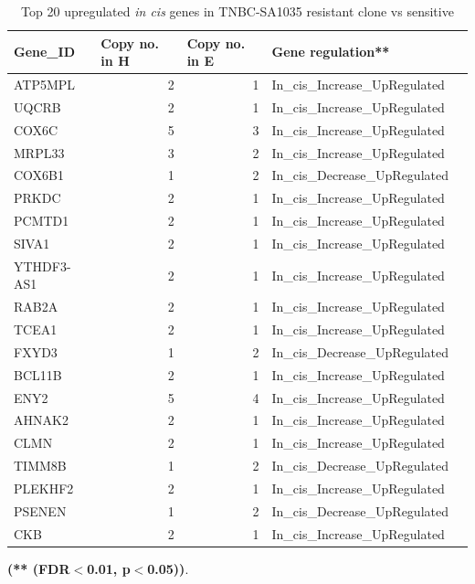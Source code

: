  \begin{table}[htbp]
   \centering
   \caption{Top 20 upregulated \textit{in cis} genes in TNBC-SA1035 resistant clone vs sensitive}
     \begin{tabular}{|l|r|r|l|r}
     \hline
     \textbf{Gene\_ID} & \multicolumn{1}{|l|}{\textbf{Copy no. in H}} & \multicolumn{1}{|l|}{\textbf{Copy no. in E}} & \textbf{Gene regulation**}\\
     
     \hline
     ATP5MPL & 2 & 1 & In\_cis\_Increase\_UpRegulated \\
     UQCRB & 2 & 1 & In\_cis\_Increase\_UpRegulated   \\
     COX6C & 5 & 3 & In\_cis\_Increase\_UpRegulated  \\
     MRPL33 & 3 & 2 & In\_cis\_Increase\_UpRegulated \\
     COX6B1 & 1 & 2 & In\_cis\_Decrease\_UpRegulated  \\
     PRKDC & 2 & 1 & In\_cis\_Increase\_UpRegulated  \\
     PCMTD1 & 2 & 1 & In\_cis\_Increase\_UpRegulated \\
     SIVA1 & 2 & 1 & In\_cis\_Increase\_UpRegulated \\
     YTHDF3-AS1 & 2 & 1 & In\_cis\_Increase\_UpRegulated \\
     RAB2A & 2 & 1 & In\_cis\_Increase\_UpRegulated \\
     TCEA1 & 2 & 1 & In\_cis\_Increase\_UpRegulated  \\
     FXYD3 & 1 & 2 & In\_cis\_Decrease\_UpRegulated  \\
     BCL11B & 2 & 1 & In\_cis\_Increase\_UpRegulated  \\
     ENY2 & 5 & 4 & In\_cis\_Increase\_UpRegulated  \\
     AHNAK2 & 2 & 1 & In\_cis\_Increase\_UpRegulated  \\
     CLMN & 2 & 1 & In\_cis\_Increase\_UpRegulated  \\
     TIMM8B & 1 & 2 & In\_cis\_Decrease\_UpRegulated  \\
     PLEKHF2 & 2 & 1 & In\_cis\_Increase\_UpRegulated  \\
     PSENEN & 1 & 2 & In\_cis\_Decrease\_UpRegulated  \\
     CKB & 2 & 1 & In\_cis\_Increase\_UpRegulated  \\
     
     \hline
     \end{tabular}%
   
   \label{tab:top20SA1035upregulated}%
 
   \small\textbf{(** (FDR$<$0.01, p$<$0.05))}.
 \end{table}%


